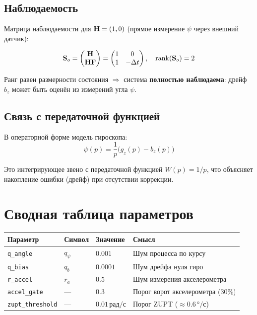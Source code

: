 \subsection{Наблюдаемость}

Матрица наблюдаемости для $\mathbf{H} = (1, 0)$
(прямое измерение $\psi$ через внешний датчик):

\begin{equation}
  \mathbf{S}_o = \begin{pmatrix} \mathbf{H} \\ \mathbf{H}\mathbf{F} \end{pmatrix}
  = \begin{pmatrix} 1 & 0 \\ 1 & -\Delta t \end{pmatrix}, \quad
  \mathrm{rank}(\mathbf{S}_o) = 2
  \label{eq:imu_observability}
\end{equation}

Ранг равен размерности состояния $\Rightarrow$ система
\textbf{полностью наблюдаема}: дрейф $b_z$ может быть оценён
из измерений угла $\psi$.

\subsection{Связь с передаточной функцией}

В операторной форме модель гироскопа:
\begin{equation}
  \psi(p) = \frac{1}{p}\bigl(g_z(p) - b_z(p)\bigr)
  \label{eq:gyro_tf}
\end{equation}

Это интегрирующее звено с передаточной функцией $W(p) = 1/p$,
что объясняет накопление ошибки (дрейф) при отсутствии коррекции.

\section{Сводная таблица параметров}

\begin{center}
\begin{tabular}{llll}
\toprule
\textbf{Параметр} & \textbf{Символ} & \textbf{Значение} & \textbf{Смысл}\\
\midrule
\texttt{q\_angle} & $q_\psi$ & $0.001$ & Шум процесса по курсу\\
\texttt{q\_bias}  & $q_b$ & $0.0001$ & Шум дрейфа нуля гиро\\
\texttt{r\_accel} & $r_a$ & $0.5$ & Шум измерения акселерометра\\
\texttt{accel\_gate} & --- & $0.3$ & Порог ворот акселерометра ($30\%$)\\
\texttt{zupt\_threshold} & --- & $0.01\,\text{рад/с}$ & Порог ZUPT (${\approx}0.6\,\text{°/с}$)\\
\bottomrule
\end{tabular}
\end{center}
